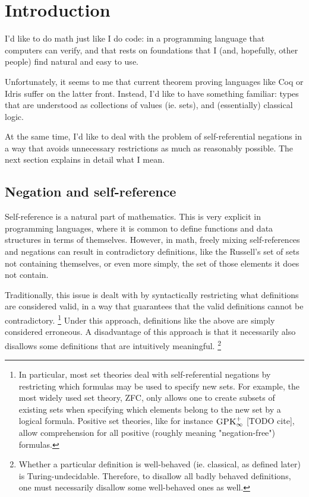 \documentclass[oneside,12pt]{book}
\theoremstyle{definition}
\theoremstyle{remark}
\newcommand{\GPKInf}{\textsc{GPK}^+_\infty}
\begin{document}
\tableofcontents


\chapter{Introduction}
I'd like to do math just like I do code: in a programming language that computers
can verify, and that rests on foundations that I (and, hopefully, other people)
find natural and easy to use.

Unfortunately, it seems to me that current theorem proving languages like Coq or
Idris suffer on the latter front.
Instead, I'd like to have something familiar: types that are understood
as collections of values (ie. sets), and (essentially) classical logic.

At the same time, I'd like to deal with the problem of self-referential negations
in a way that avoids unnecessary restrictions as much as reasonably possible.
The next section explains in detail what I mean.

\section{Negation and self-reference}

Self-reference is a natural part of mathematics.
This is very explicit in programming languages, where it is common to define
functions and data structures in terms of themselves.
However, in math, freely mixing self-references and negations can result
in contradictory definitions, like the Russell's set of sets not containing
themselves, or even more simply, the set of those elements it does not contain.

Traditionally, this issue is dealt with by syntactically restricting what
definitions are considered valid, in a way that guarantees that the valid
definitions cannot be contradictory.%
%
\footnote{In particular, most set theories deal with self-referential negations
by restricting which formulas may be used to specify new sets. For example,
the most widely used set theory, ZFC, only allows one to create subsets
of existing sets when specifying which elements belong to the new set by a logical
formula. Positive set theories, like for instance $\GPKInf$ [TODO cite], allow
comprehension for all positive (roughly meaning "negation-free") formulas.}
%
Under this approach, definitions like the above are simply considered erroneous.
A disadvantage of this approach is that it necessarily also disallows some
definitions that are intuitively meaningful.%
%
\footnote{Whether a particular definition is well-behaved (ie. classical, as defined
later) is Turing-undecidable. Therefore, to disallow all badly behaved definitions,
one must necessarily disallow some well-behaved ones as well.}
\end{document}
